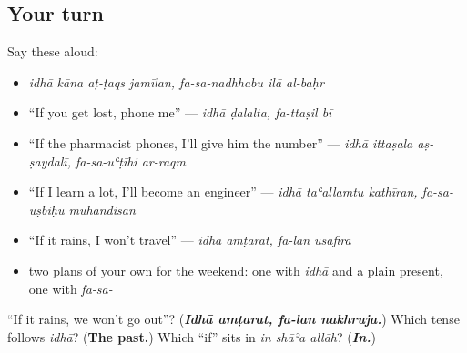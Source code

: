\subsection*{Your turn}
Say these aloud:

\begin{itemize}
\raggedright
  \item \emph{idhā kāna aṭ-ṭaqs jamīlan, fa-sa-nadhhabu ilā al-baḥr}
  \item \textquotedblleft{}If you get lost, phone me\textquotedblright{} — \emph{idhā ḍalalta, fa-ttaṣil bī}
  \item \textquotedblleft{}If the pharmacist phones, I'll give him the number\textquotedblright{} — \emph{idhā ittaṣala aṣ-ṣaydalī, fa-sa-uʿṭīhi ar-raqm}
  \item \textquotedblleft{}If I learn a lot, I'll become an engineer\textquotedblright{} — \emph{idhā taʿallamtu kathīran, fa-sa-uṣbiḥu muhandisan}
  \item \textquotedblleft{}If it rains, I won't travel\textquotedblright{} — \emph{idhā amṭarat, fa-lan usāfira}
  \item two plans of your own for the weekend: one with \emph{idhā} and a plain present, one with \emph{fa-sa-}
\end{itemize}

\begin{tcolorbox}[breakable,colback=teal!4,colframe=teal!35!black,title={Before you move on}]
\textquotedblleft{}If it rains, we won't go out\textquotedblright{}? (\emph{\textbf{Idhā amṭarat, fa-lan nakhruja.}}) Which tense follows \emph{idhā}? (\textbf{The past.}) Which \textquotedblleft{}if\textquotedblright{} sits in \emph{in shāʾa allāh}? (\emph{\textbf{In.}})
\end{tcolorbox}
